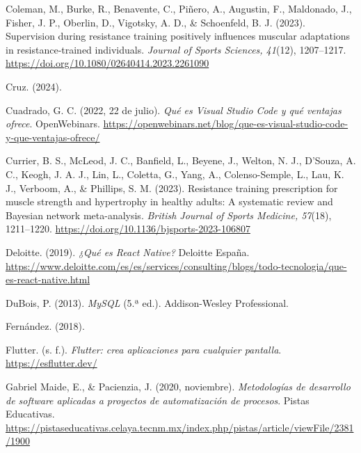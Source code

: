 \begin{referenciasapa}
\item Coleman, M., Burke, R., Benavente, C., Piñero, A., Augustin, F., Maldonado, J., Fisher, J. P., Oberlin, D., Vigotsky, A. D., \& Schoenfeld, B. J. (2023). Supervision during resistance training positively influences muscular adaptations in resistance-trained individuals. \textit{Journal of Sports Sciences, 41}(12), 1207--1217. \url{https://doi.org/10.1080/02640414.2023.2261090}

\item Cruz. (2024). 

\item Cuadrado, G. C. (2022, 22 de julio). \textit{Qué es Visual Studio Code y qué ventajas ofrece}. OpenWebinars. \url{https://openwebinars.net/blog/que-es-visual-studio-code-y-que-ventajas-ofrece/}

\item Currier, B. S., McLeod, J. C., Banfield, L., Beyene, J., Welton, N. J., D'Souza, A. C., Keogh, J. A. J., Lin, L., Coletta, G., Yang, A., Colenso-Semple, L., Lau, K. J., Verboom, A., \& Phillips, S. M. (2023).
    Resistance training prescription for muscle strength and hypertrophy in healthy adults: A systematic review and Bayesian network meta-analysis.
    \textit{British Journal of Sports Medicine, 57}(18), 1211--1220.
    \url{https://doi.org/10.1136/bjsports-2023-106807}

\item Deloitte. (2019). \textit{¿Qué es React Native?} Deloitte España. \url{https://www.deloitte.com/es/es/services/consulting/blogs/todo-tecnologia/que-es-react-native.html}

\item DuBois, P. (2013). \textit{MySQL} (5.ª ed.). Addison-Wesley Professional.

\item Fernández. (2018). 

\item Flutter. (s. f.). \textit{Flutter: crea aplicaciones para cualquier pantalla}. \url{https://esflutter.dev/}

\item Gabriel Maide, E., \& Pacienzia, J. (2020, noviembre). \textit{Metodologías de desarrollo de software aplicadas a proyectos de automatización de procesos}. Pistas Educativas. \url{https://pistaseducativas.celaya.tecnm.mx/index.php/pistas/article/viewFile/2381/1900}


\end{referenciasapa}
